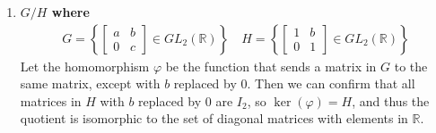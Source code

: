 \documentclass[a4paper,12pt]{article}
\begin{document}
\begin{enumerate}
\begin{enumerate}
            \item
                \boldmath
                \textbf{$G/H$ where
                    \begin{align*}
                        G = \left\{
                            \left[ \begin{array}{cc}
                                    a & b \\
                                    0 & c
                            \end{array} \right]
                            \in GL_2(\mathbb{R})
                        \right\}
                        \quad
                        H = \left\{
                            \left[ \begin{array}{cc}
                                    1 & b \\
                                    0 & 1
                            \end{array} \right]
                            \in GL_2(\mathbb{R})
                        \right\}
                    \end{align*}
                }
                \unboldmath
                Let the homomorphism $\varphi$ be the function that sends a matrix in $G$ to the same matrix, except with $b$ replaced by $0$. Then we can confirm that all matrices in $H$ with $b$ replaced by $0$ are $I_2$, so $\ker(\varphi) = H$, and thus the quotient is isomorphic to the set of diagonal matrices with elements in $\mathbb{R}$.
        \end{enumerate}
\end{enumerate}
\end{document}
